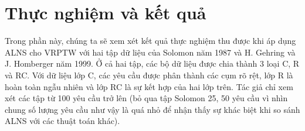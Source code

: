 \chapter{Thực nghiệm và kết quả}
\label{chap:experiment}

Trong phần này, chúng ta sẽ xem xét kết quả thực nghiệm thu được khi áp dụng ALNS cho VRPTW với hai tập dữ liệu của Solomon \cite{solomon1987algorithms} năm 1987 và H. Gehring và J. Homberger \cite{gehring1999parallel} năm 1999. Ở cả hai tập, các bộ dữ liệu được chia thành 3 loại C, R và RC. Với dữ liệu lớp C, các yêu cầu được phân thành các cụm rõ rệt, lớp R là hoàn toàn ngẫu nhiên và lớp RC là sự kết hợp của hai lớp trên. Tác giả chỉ xem xét các tập từ 100 yêu cầu trở lên (bỏ qua tập Solomon 25, 50 yêu cầu vì nhìn chung số lượng yêu cầu như vậy là quá nhỏ để nhận thấy sự khác biệt khi so sánh ALNS với các thuật toán khác).

